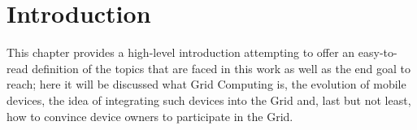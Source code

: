 \chapter{Introduction}\label{introduction}
This chapter provides a high-level introduction attempting to offer an easy-to-read definition of the topics that are faced in this work as well as the end goal to reach; here it will be discussed what Grid Computing is, the evolution of mobile devices, the idea of integrating such devices into the Grid and, last but not least, how to convince device owners to participate in the Grid.





